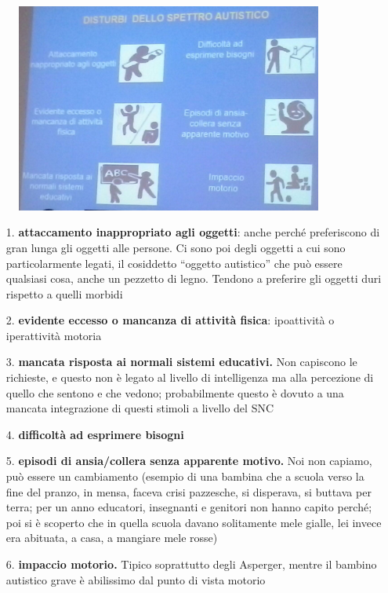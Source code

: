 \begin{figure}[!ht]
\centering
	\includegraphics[width=0.9\textwidth]{014/image2.png}
\end{figure}

\begin{itemize}
\item[1.]
  \textbf{attaccamento inappropriato agli oggetti}: anche perché
  preferiscono di gran lunga gli oggetti alle persone. Ci sono poi degli
  oggetti a cui sono particolarmente legati, il cosiddetto ``oggetto
  autistico'' che può essere qualsiasi cosa, anche un pezzetto di legno.
  Tendono a preferire gli oggetti duri rispetto a quelli morbidi
\item[2.]
  \textbf{evidente eccesso o mancanza di attività fisica}: ipoattività o
  iperattività motoria
\item[3.]
  \textbf{mancata risposta ai normali sistemi educativi.} Non capiscono
  le richieste, e questo non è legato al livello di intelligenza ma alla
  percezione di quello che sentono e che vedono; probabilmente questo è
  dovuto a una mancata integrazione di questi stimoli a livello del SNC
\item[4.]
  \textbf{difficoltà ad esprimere bisogni}
\item[5.]
  \textbf{episodi di ansia/collera senza apparente motivo.} Noi non
  capiamo, può essere un cambiamento (esempio di una bambina che a
  scuola verso la fine del pranzo, in mensa, faceva crisi pazzesche, si
  disperava, si buttava per terra; per un anno educatori, insegnanti e
  genitori non hanno capito perché; poi si è scoperto che in quella
  scuola davano solitamente mele gialle, lei invece era abituata, a
  casa, a mangiare mele rosse)
\item[6.]
  \textbf{impaccio motorio.} Tipico soprattutto degli Asperger, mentre
  il bambino autistico grave è abilissimo dal punto di vista motorio
\end{itemize}

